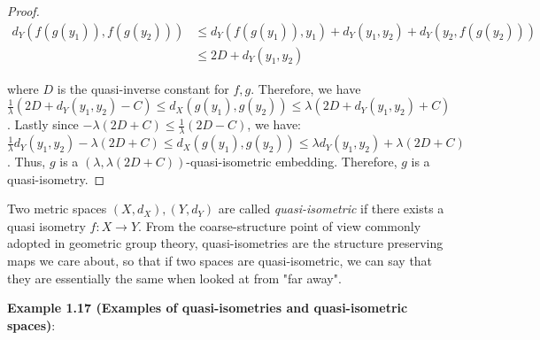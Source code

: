 \documentclass[12pt]{article}
\newcommand{\vs}{\vskip10pt}
\begin{document}
\begin{proof}
 		\begin{align*}
 		d_Y(f(g(y_1)), f(g(y_2))) &\leq d_Y(f(g(y_1)), y_1) + d_Y(y_1, y_2) + d_Y(y_2, f(g(y_2))) \\
 		&\leq 2D + d_Y(y_1,y_2)
 		\end{align*}
 		
 		 where $D$ is the quasi-inverse constant for $f,g$. Therefore, we have $\frac{1}{\lambda} (2D + d_Y(y_1, y_2) - C) \leq  d_X(g(y_1), g(y_2)) \leq \lambda (2D + d_Y(y_1, y_2) + C)$. Lastly since $-\lambda(2D + C) \leq \frac{1}{\lambda} (2D - C)$, we have: $\frac{1}{\lambda} d_Y(y_1, y_2) - \lambda (2D + C) \leq d_X(g(y_1), g(y_2)) \leq \lambda d_Y(y_1, y_2) + \lambda(2D + C)$. Thus, $g$ is a $(\lambda, \lambda(2D + C))$-quasi-isometric embedding. Therefore, $g$ is a quasi-isometry. 
 		
 	\end{proof}
 
 	Two metric spaces $(X, d_X), (Y, d_Y)$ are called \textit{quasi-isometric} if there exists a quasi isometry $f: X \rightarrow Y$. From the coarse-structure point of view commonly adopted in geometric group theory, quasi-isometries are the structure preserving maps we care about, so that if two spaces are quasi-isometric, we can say that they are essentially the same when looked at from "far away". 
 
 	\vs 
 	
 	\textbf{Example 1.17 (Examples of quasi-isometries and quasi-isometric spaces)}:
 	
\end{document}
